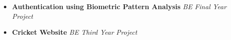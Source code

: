 \begin{itemize}

	\item \textbf{Authentication using Biometric Pattern Analysis} \hfill \emph{BE Final Year Project} \\[-0.6cm]
	\item \textbf{Cricket Website} \hfill \emph{BE Third Year Project} \\[-0.6cm]
\end{itemize}

